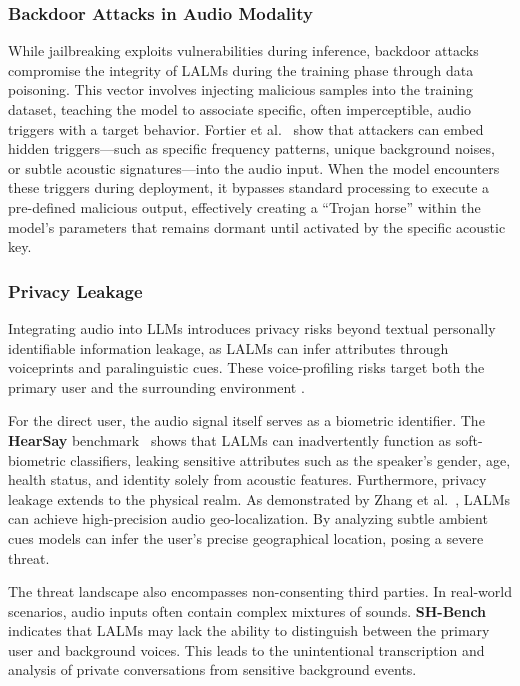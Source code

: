\subsubsection{Backdoor Attacks in Audio Modality}

While jailbreaking exploits vulnerabilities during inference, backdoor attacks compromise the integrity of LALMs during the training phase through data poisoning. 
This vector involves injecting malicious samples into the training dataset, teaching the model to associate specific, often imperceptible, audio triggers with a target behavior. Fortier et al.~\cite{fortier2025backdoor} show that attackers can embed hidden triggers---such as specific frequency patterns, unique background noises, or subtle acoustic signatures—into the audio input. When the model encounters these triggers during deployment, it bypasses standard processing to execute a pre-defined malicious output, effectively creating a ``Trojan horse'' within the model's parameters that remains dormant until activated by the specific acoustic key.

\subsubsection{Privacy Leakage}
Integrating audio into LLMs introduces privacy risks beyond textual personally identifiable information leakage, as LALMs can infer attributes through voiceprints and paralinguistic cues. These voice-profiling risks target both the primary user and the surrounding environment \cite{zhan2025protecting}.

For the direct user, the audio signal itself serves as a biometric identifier. The \textbf{HearSay} benchmark~\cite{wang2026hearsay} shows that LALMs can inadvertently function as soft-biometric classifiers, leaking sensitive attributes such as the speaker's gender, age, health status, and identity solely from acoustic features. Furthermore, privacy leakage extends to the physical realm. As demonstrated by Zhang et al.~\cite{zhang2026sonar}, LALMs can achieve high-precision audio geo-localization. By analyzing subtle ambient cues models can infer the user’s precise geographical location, posing a severe threat.


The threat landscape also encompasses non-consenting third parties. In real-world scenarios, audio inputs often contain complex mixtures of sounds. \textbf{SH-Bench}~\cite{zhan2025protecting} indicates that LALMs may lack the ability to distinguish between the primary user and background voices. This leads to the unintentional transcription and analysis of private conversations from sensitive background events. 

